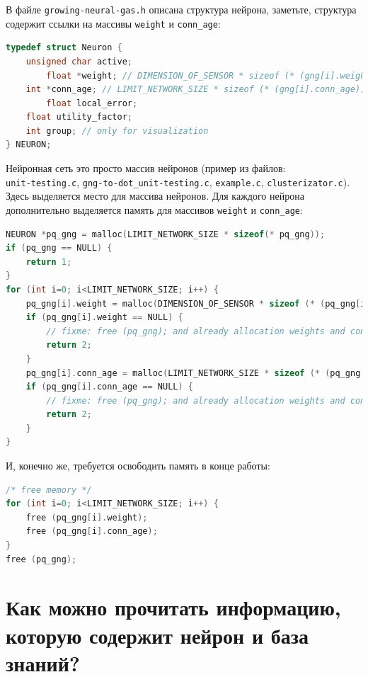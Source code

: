 \documentclass[unicode, 12pt, a4paper,oneside,fleqn]{article}
\begin{document}
В файле \verb'growing-neural-gas.h' описана структура нейрона,
заметьте, структура содержит ссылки на массивы \verb'weight' и
\verb'conn_age':

\begin{lstlisting}[language=C,
  caption={Описание структуры нейрона},
  captionpos=b,
  label={nueron:code}]
typedef struct Neuron {
	unsigned char active;
        float *weight; // DIMENSION_OF_SENSOR * sizeof (* (gng[i].weight))
	int *conn_age; // LIMIT_NETWORK_SIZE * sizeof (* (gng[i].conn_age))
        float local_error;
	float utility_factor;
	int group; // only for visualization
} NEURON;
\end{lstlisting}


Нейронная сеть это просто массив нейронов (пример из файлов:\\
\verb'unit-testing.c', \verb'gng-to-dot_unit-testing.c',
\verb'example.c', \verb'clusterizator.c').  Здесь выделяется место
для массива нейронов.  Для каждого нейрона дополнительно выделяется
память для массивов \verb'weight' и \verb'conn_age':

\begin{lstlisting}[language=C,
  caption={Выделение памяти},
  captionpos=b,
  label={malloc:code}]
NEURON *pq_gng = malloc(LIMIT_NETWORK_SIZE * sizeof(* pq_gng));
if (pq_gng == NULL) {
	return 1;
}
for (int i=0; i<LIMIT_NETWORK_SIZE; i++) {
	pq_gng[i].weight = malloc(DIMENSION_OF_SENSOR * sizeof (* (pq_gng[i].weight)));
	if (pq_gng[i].weight == NULL) {
		// fixme: free (pq_gng); and already allocation weights and conn_ages
		return 2;
	}
	pq_gng[i].conn_age = malloc(LIMIT_NETWORK_SIZE * sizeof (* (pq_gng[i].conn_age)));
	if (pq_gng[i].conn_age == NULL) {
		// fixme: free (pq_gng); and already allocation weights and conn_ages
		return 2;
	}
}
\end{lstlisting}

И, конечно же, требуется освободить память в конце работы:
\begin{lstlisting}[language=C,
  caption={Освобождение памяти},
  captionpos=b,
  label={free:code}]
/* free memory */
for (int i=0; i<LIMIT_NETWORK_SIZE; i++) {
	free (pq_gng[i].weight);
	free (pq_gng[i].conn_age);
}
free (pq_gng);
\end{lstlisting}



\clearpage
\section{Как можно прочитать информацию, которую содержит нейрон и база знаний?}
\end{document}
